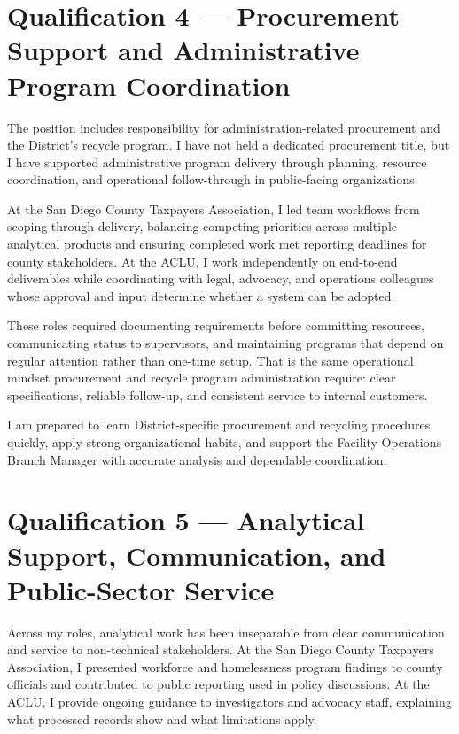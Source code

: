 \documentclass[letterpaper,11pt]{article}
\begin{document}
\section{Qualification 4 --- Procurement Support and Administrative Program Coordination}

The position includes responsibility for administration-related procurement and the District's recycle program.
I have not held a dedicated procurement title, but I have supported administrative program delivery through planning,
resource coordination, and operational follow-through in public-facing organizations.

At the San Diego County Taxpayers Association, I led team workflows from scoping through delivery, balancing competing
priorities across multiple analytical products and ensuring completed work met reporting deadlines for county stakeholders.
At the ACLU, I work independently on end-to-end deliverables while coordinating with legal, advocacy, and operations
colleagues whose approval and input determine whether a system can be adopted.

These roles required documenting requirements before committing resources, communicating status to supervisors,
and maintaining programs that depend on regular attention rather than one-time setup. That is the same operational
mindset procurement and recycle program administration require: clear specifications, reliable follow-up, and
consistent service to internal customers.

I am prepared to learn District-specific procurement and recycling procedures quickly, apply strong organizational
habits, and support the Facility Operations Branch Manager with accurate analysis and dependable coordination.

\section{Qualification 5 --- Analytical Support, Communication, and Public-Sector Service}

Across my roles, analytical work has been inseparable from clear communication and service to non-technical stakeholders.
At the San Diego County Taxpayers Association, I presented workforce and homelessness program findings to county
officials and contributed to public reporting used in policy discussions. At the ACLU, I provide ongoing guidance
to investigators and advocacy staff, explaining what processed records show and what limitations apply.
\end{document}
